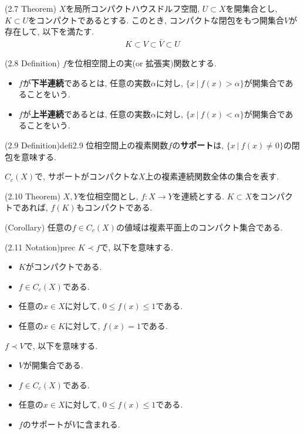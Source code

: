 \documentclass[a4paper]{jsarticle}
\begin{document}
\begin{thm}{(2.7 Theorem)}{}
    $X$を局所コンパクトハウスドルフ空間, $U\subset X$を開集合とし, $K\subset U$をコンパクトであるとする. このとき, コンパクトな閉包をもつ開集合$V$が存在して, 以下を満たす.
    \begin{align*}
        K\subset V\subset \bar{V}\subset U
    \end{align*}
\end{thm}
\begin{defi}{(2.8 Definition)}{}
    $f$を位相空間上の実(or 拡張実)関数とする.
    \begin{itemize}
        \item $f$が{\bf 下半連続}であるとは, 任意の実数$\alpha$に対し, $\{x \ |\ f(x) > \alpha \}$が開集合であることをいう.
        \item $f$が{\bf 上半連続}であるとは, 任意の実数$\alpha$に対し, $\{x \ |\ f(x) < \alpha \}$が開集合であることをいう.
    \end{itemize}
\end{defi}
\begin{defi}{(2.9 Definition)}{defi2.9}
    位相空間上の複素関数$f$の{\bf サポート}は, $\{ x \ | \ f(x)\neq 0 \}$の閉包を意味する.

    $C_c(X)$で, サポートがコンパクトな$X$上の複素連続関数全体の集合を表す.
\end{defi}
\begin{thm}{(2.10 Theorem)}{}
    $X, Y$を位相空間とし, $f:X\to Y$を連続とする. $K\subset X$をコンパクトであれば, $f(K)$もコンパクトである.
\end{thm}
\begin{cor}{(Corollary)}{}
    任意の$f\in C_c(X)$の値域は複素平面上のコンパクト集合である.
\end{cor}
\begin{defi}{(2.11 Notation)}{prec}
    $K\prec f$で, 以下を意味する.
    \begin{itemize}
        \item $K$がコンパクトである.
        \item $f\in C_c(X)$である.
        \item 任意の$x\in X$に対して, $0\leq f(x)\leq 1$である.
        \item 任意の$x\in K$に対して, $f(x)=1$である.
    \end{itemize}

    $f\prec V$で, 以下を意味する.
    \begin{itemize}
        \item $V$が開集合である.
        \item $f\in C_c(X)$である.
        \item 任意の$x\in X$に対して, $0\leq f(x)\leq 1$である.
        \item $f$のサポートが$V$に含まれる.
    \end{itemize}
\end{defi}
\end{document}
